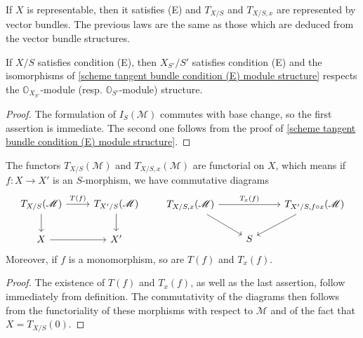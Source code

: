 \begin{remark}
If $X$ is representable, then it satisfies (E) and $T_{X/S}$ and $T_{X/S,x}$ are represented by vector bundles. The previous laws are the same as those which are deduced from the vector bundle structures.
\end{remark}

\begin{proposition}\label{scheme tangent bundle condition (E) base change}
If $X/S$ satisfies condition (E), then $X_{S'}/S'$ satisfies condition (E) and the isomorphisms of \cref{scheme tangent bundle condition (E) module structure} respects the $\mathbb{O}_{X_{S'}}$-module (resp. $\mathbb{O}_{S'}$-module) structure.
\end{proposition}
\begin{proof}
The formulation of $I_S(\mathscr{M})$ commutes with base change, so the first assertion is immediate. The second one follows from the proof of \cref{scheme tangent bundle condition (E) module structure}.
\end{proof}

\begin{proposition}\label{scheme tangent bundle functorial on X}
The functors $T_{X/S}(\mathscr{M})$ and $T_{X/S,x}(\mathscr{M})$ are functorial on $X$, which means if $f:X\to X'$ is an $S$-morphism, we have commutative diagrams
\[\begin{tikzcd}
T_{X/S}(\mathscr{M})\ar[r,"T(f)"]\ar[d]&T_{X'/S}(\mathscr{M})\ar[d]\\
X\ar[r]&X'
\end{tikzcd}\quad\quad
\begin{tikzcd}
T_{X/S,x}(\mathscr{M})\ar[rd]\ar[rr,"T_x(f)"]&&T_{X'/S,f\circ x}(\mathscr{M})\ar[ld]\\
&S&
\end{tikzcd}\]
Moreover, if $f$ is a monomorphism, so are $T(f)$ and $T_x(f)$.
\end{proposition}
\begin{proof}
The existence of $T(f)$ and $T_x(f)$, as well as the last assertion, follow immediately from definition. The commutativity of the diagrams then follows from the functoriality of these morphisms with respect to $\mathscr{M}$ and of the fact that $X=T_{X/S}(0)$.
\end{proof}

